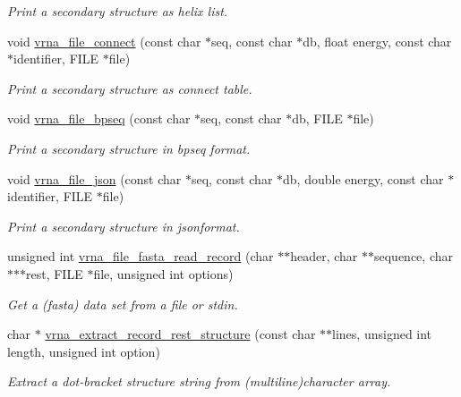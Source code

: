 \begin{DoxyCompactItemize}
\begin{DoxyCompactList}\small\item\em Print a secondary structure as helix list. \end{DoxyCompactList}\item 
void \hyperlink{group__file__utils_gab69682373ccca1e0e28cc967eec07745}{vrna\+\_\+file\+\_\+connect} (const char $\ast$seq, const char $\ast$db, float energy, const char $\ast$identifier, F\+I\+LE $\ast$file)
\begin{DoxyCompactList}\small\item\em Print a secondary structure as connect table. \end{DoxyCompactList}\item 
void \hyperlink{group__file__utils_ga9b462e6f202594af5d3fa56e280d633f}{vrna\+\_\+file\+\_\+bpseq} (const char $\ast$seq, const char $\ast$db, F\+I\+LE $\ast$file)
\begin{DoxyCompactList}\small\item\em Print a secondary structure in bpseq format. \end{DoxyCompactList}\item 
void \hyperlink{group__file__utils_ga31f4a6c2ea1495a6e4f9eb45a9f6193d}{vrna\+\_\+file\+\_\+json} (const char $\ast$seq, const char $\ast$db, double energy, const char $\ast$identifier, F\+I\+LE $\ast$file)
\begin{DoxyCompactList}\small\item\em Print a secondary structure in jsonformat. \end{DoxyCompactList}\item 
unsigned int \hyperlink{group__file__utils_ga8cfb7e271efc9e1f34640acb85475639}{vrna\+\_\+file\+\_\+fasta\+\_\+read\+\_\+record} (char $\ast$$\ast$header, char $\ast$$\ast$sequence, char $\ast$$\ast$$\ast$rest, F\+I\+LE $\ast$file, unsigned int options)
\begin{DoxyCompactList}\small\item\em Get a (fasta) data set from a file or stdin. \end{DoxyCompactList}\item 
char $\ast$ \hyperlink{group__file__utils_gad37cbb63a05eed63ba25c91628409be0}{vrna\+\_\+extract\+\_\+record\+\_\+rest\+\_\+structure} (const char $\ast$$\ast$lines, unsigned int length, unsigned int option)
\begin{DoxyCompactList}\small\item\em Extract a dot-\/bracket structure string from (multiline)character array. \end{DoxyCompactList}\item 
$$
\end{DoxyCompactItemize}
